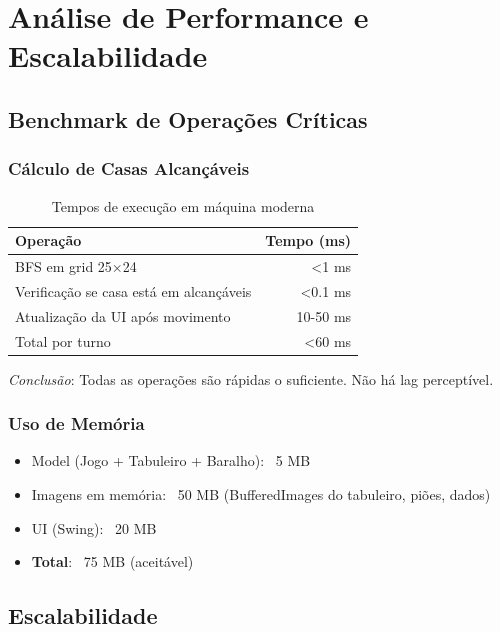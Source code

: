 \documentclass[12pt,a4paper]{report}
\begin{document}
\chapter{Análise de Performance e Escalabilidade}

\section{Benchmark de Operações Críticas}

\subsection{Cálculo de Casas Alcançáveis}

\begin{table}[H]
\centering
\begin{tabular}{|l|r|}
\hline
\textbf{Operação} & \textbf{Tempo (ms)} \\
\hline
BFS em grid 25×24 & \textless 1 ms \\
\hline
Verificação se casa está em alcançáveis & \textless 0.1 ms \\
\hline
Atualização da UI após movimento & 10-50 ms \\
\hline
Total por turno & \textless 60 ms \\
\hline
\end{tabular}
\caption{Tempos de execução em máquina moderna}
\end{table}

\textit{Conclusão}: Todas as operações são rápidas o suficiente. Não há lag perceptível.

\subsection{Uso de Memória}

\begin{itemize}
    \item Model (Jogo + Tabuleiro + Baralho): ~5 MB
    \item Imagens em memória: ~50 MB (BufferedImages do tabuleiro, piões, dados)
    \item UI (Swing): ~20 MB
    \item \textbf{Total}: ~75 MB (aceitável)
\end{itemize}

\section{Escalabilidade}
\end{document}
